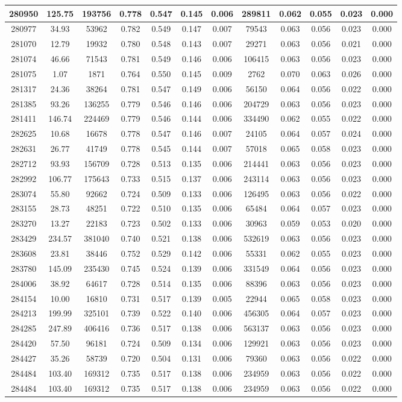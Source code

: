\documentclass[10pt]{extarticle}
\begin{document}
\begin{longtable}{|c|c|c|c|c|c|c|c|c|c|c|c|}
\hline 
280950&125.75&193756&0.778&0.547&0.145&0.006&289811&0.062&0.055&0.023&0.000 \\ 
\hline 
280977&34.93&53962&0.782&0.549&0.147&0.007&79543&0.063&0.056&0.023&0.000 \\ 
\hline 
281070&12.79&19932&0.780&0.548&0.143&0.007&29271&0.063&0.056&0.021&0.000 \\ 
\hline 
281074&46.66&71543&0.781&0.549&0.146&0.006&106415&0.063&0.056&0.023&0.000 \\ 
\hline 
281075&1.07&1871&0.764&0.550&0.145&0.009&2762&0.070&0.063&0.026&0.000 \\ 
\hline 
281317&24.36&38264&0.781&0.547&0.149&0.006&56150&0.064&0.056&0.022&0.000 \\ 
\hline 
281385&93.26&136255&0.779&0.546&0.146&0.006&204729&0.063&0.056&0.023&0.000 \\ 
\hline 
281411&146.74&224469&0.779&0.546&0.144&0.006&334490&0.062&0.055&0.022&0.000 \\ 
\hline 
282625&10.68&16678&0.778&0.547&0.146&0.007&24105&0.064&0.057&0.024&0.000 \\ 
\hline 
282631&26.77&41749&0.778&0.545&0.144&0.007&57018&0.065&0.058&0.023&0.000 \\ 
\hline 
282712&93.93&156709&0.728&0.513&0.135&0.006&214441&0.063&0.056&0.023&0.000 \\ 
\hline 
282992&106.77&175643&0.733&0.515&0.137&0.006&243114&0.063&0.056&0.023&0.000 \\ 
\hline 
283074&55.80&92662&0.724&0.509&0.133&0.006&126495&0.063&0.056&0.022&0.000 \\ 
\hline 
283155&28.73&48251&0.722&0.510&0.135&0.006&65484&0.064&0.057&0.023&0.000 \\ 
\hline 
283270&13.27&22183&0.723&0.502&0.133&0.006&30963&0.059&0.053&0.020&0.000 \\ 
\hline 
283429&234.57&381040&0.740&0.521&0.138&0.006&532619&0.063&0.056&0.023&0.000 \\ 
\hline 
283608&23.81&38446&0.752&0.529&0.142&0.006&55331&0.062&0.055&0.023&0.000 \\ 
\hline 
283780&145.09&235430&0.745&0.524&0.139&0.006&331549&0.064&0.056&0.023&0.000 \\ 
\hline 
284006&38.92&64617&0.728&0.514&0.135&0.006&88396&0.063&0.056&0.023&0.000 \\ 
\hline 
284154&10.00&16810&0.731&0.517&0.139&0.005&22944&0.065&0.058&0.023&0.000 \\ 
\hline 
284213&199.99&325101&0.739&0.522&0.140&0.006&456305&0.064&0.057&0.023&0.000 \\ 
\hline 
284285&247.89&406416&0.736&0.517&0.138&0.006&563137&0.063&0.056&0.023&0.000 \\ 
\hline 
284420&57.50&96181&0.724&0.509&0.134&0.006&129921&0.063&0.056&0.023&0.000 \\ 
\hline 
284427&35.26&58739&0.720&0.504&0.131&0.006&79360&0.063&0.056&0.022&0.000 \\ 
\hline 
284484&103.40&169312&0.735&0.517&0.138&0.006&234959&0.063&0.056&0.022&0.000 \\ 
\hline 
284484&103.40&169312&0.735&0.517&0.138&0.006&234959&0.063&0.056&0.022&0.000 \\ 
\hline 
\end{longtable} 
\end{document}
